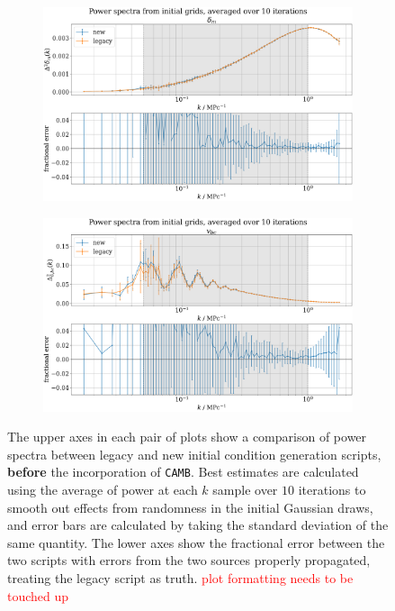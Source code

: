 \documentclass[floats,floatfix,showpacs,amssymb,prd,superscriptaddress,nofootinbib]{revtex4-2} %
\newcommand{\code}{\texttt}
\newcommand{\red}{\textcolor{red}}
\begin{document}
\newpage
\begin{figure}[H]
     \centering
     \begin{subfigure}[b]{0.9\textwidth}
         \centering
         \includegraphics[width=\textwidth]{images/ic_power_spectra/compare_generators_averaged_power_spectra_with_residual_noCAMB_delta_m.png}
         \label{fig:compare_generators_power_spectrum_noCAMB_delta_m}
     \end{subfigure}
     \hfill
     \begin{subfigure}[b]{0.9\textwidth}
         \centering
         \includegraphics[width=\textwidth]{images/ic_power_spectra/compare_generators_averaged_power_spectra_with_residual_noCAMB_v_bc.png}
         \label{fig:compare_generators_power_spectrum_noCAMB_vbc}
     \end{subfigure}
        \caption{The upper axes in each pair of plots show a comparison of power spectra between legacy and new initial condition generation scripts, \textbf{before} the incorporation of \code{CAMB}. Best estimates are calculated using the average of power at each $k$ sample over $10$ iterations to smooth out effects from randomness in the initial Gaussian draws, and error bars are calculated by taking the standard deviation of the same quantity. The lower axes show the fractional error between the two scripts with errors from the two sources properly propagated, treating the legacy script as truth. \red{plot formatting needs to be touched up}}
        \label{fig:compare_generators_noCAMB}
\end{figure}
\end{document}
